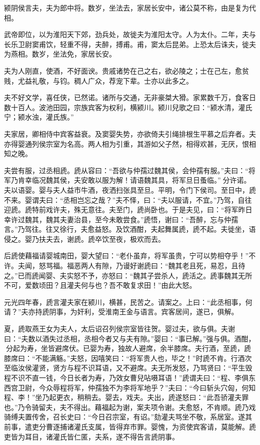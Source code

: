 \documentclass[12pt,UTF8]{ctexbook}
\begin{document}
颍阴侯言夫，夫为郎中将。数岁，坐法去，家居长安中，诸公莫不称，由是复为代相。



武帝即位，以为淮阳天下郊，劲兵处，故徙夫为淮阳太守。人为太仆。二年，夫与长乐卫尉窦甫饮，轻重不得，夫醉，搏甫。甫，窦太后昆弟。上恐太后诛夫，徙夫为燕相。数岁，坐法免，家居长安。



夫为人刚直，使酒，不好面谀。贵戚诸势在己之右，欲必陵之；士在己左，愈贫贱，尤益礼敬，与钧。稠人广众，荐宠下辈。士亦以此多之。



夫不好文学，喜任侠，已然诺。诸所与交通，无非豪桀大猾。家累数千万，食客日数十百人。波池田园，宗族宾客为权利，横颍川。颍川兒歌之曰：“颍水清，灌氏宁；颍水浊，灌氏族。”



夫家居，卿相侍中宾客益衰。及窦婴失势，亦欲倚夫引绳排根生平慕之后弃者。夫亦得婴通列侯宗室为名高。两人相为引重，其游如父子然，相得欢甚，无厌，恨相知之晚。



夫尝有服，过丞相虒。虒从容曰：“吾欲与仲孺过魏其侯，会仲孺有服。”夫曰：“将军乃肯幸临况魏其侯，夫安敢以服为解！请语魏其具，将军旦日蚤临。”分许诺。夫以语婴。婴与夫人益市牛酒，夜洒扫张具至旦。平明，令门下侯司。至日中，虒不来。婴谓夫曰：“丞相岂忘之哉？”夫不怿，曰：“夫以服请，不宜。”乃驾，自往迎虒。虒特前戏许夫，殊无意往。夫至门，虒尚卧也。于是夫见，曰：“将军昨日幸许过魏其，魏其夫妻治县，至今未敢尝食。”虒悟，谢曰：“吾醉，忘与仲孺言。”乃驾往。往又徐行，夫愈益怒。及饮酒酣，夫起舞属虒，虒不起。夫徙坐，语侵之。婴乃扶夫去，谢虒。虒卒饮至夜，极欢而去。



后虒使藉福请婴城南田，婴大望曰：“老仆虽弃，将军虽贵，宁可以势相夺乎！”不许。夫闻，怒骂福。福恶两人有隙，乃谩好谢虒曰：“魏其老且死，易忍，且待之。”已而虒闻婴、夫实怒不予，亦怒曰：“魏其子尝杀人，虒活之。虒事魏其无所不可，爱数顷田？且灌夫何与也？吾不敢复求田！”由此大怒。



元光四年春，虒言灌夫家在颍川，横甚，民苦之。请案之。上曰：“此丞相事，何请？”夫亦持虒阴事，为奸利，受淮南王金与语言。宾客居间，遂已，俱解。



夏，虒取燕王女为夫人，太后诏召列侯宗室皆往贺。婴过夫，欲与俱。夫谢曰：“夫数以酒失过丞相，丞相今者又与夫有隙。”婴曰：“事已解。”强与俱。酒酣，分起为寿，坐皆避席伏。已婴为寿，独故人避席，余半膝席。夫行酒，至虒，虒膝席曰：“不能满觞。”夫怒，因嘻笑曰：“将军贵人也，毕之！”时虒不肯。行酒次至临汝侯灌贤，贤方与程不识耳语，又不避席。夫无所发怒，乃骂贤曰：“平生毁程不识不直一钱，今日长者为寿，乃效女曹兒呫嗫耳语！”虒谓夫曰：“程、李俱东西宫卫尉，今众辱程将军，仲孺独不为李将军地乎？”夫曰：“今曰斩头穴匈，何知程、李！”坐乃起更衣，稍稍去。婴去，戏夫。夫出，虒遂怒曰：“此吾骄灌夫罪也。”乃令骑留夫，夫不得出。藉福起为谢，案夫项令谢。夫愈怒，不肯顺。虒乃戏骑缚夫置传舍，召长史曰：“今日召宗室，有诏。”劾灌夫骂坐不敬，系居室。遂其前事，遣吏分曹逐捕诸灌氏支属，皆得弃市罪。婴愧，为资使宾客请，莫能解。虒吏皆为耳目，诸灌氏皆仁匿，夫系，遂不得告言虒阴事。
\end{document}
